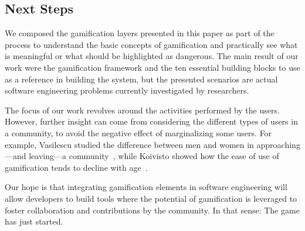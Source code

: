 \subsection{Next Steps}

We composed the gamification layers presented in this paper as part of the process to understand the basic concepts of gamification and practically see what is meaningful or what should be highlighted as dangerous.
The main result of our work were the gamification framework and the ten essential building blocks to use as a reference in building the system, but the presented scenarios are actual software engineering problems currently investigated by researchers.

The focus of our work revolves around the activities performed by the users.
However, further insight can come from considering the different types of users in a community, to avoid the negative effect of marginalizing some users.
For example, Vasilescu \etal studied the difference between men and women in approaching---and leaving---a community~\cite{vasi2012}, while Koivisto \etal showed how the ease of use of gamification tends to decline with age~\cite{koiv2014}.


Our hope is that integrating gamification elements in software engineering will allow developers to build tools where the potential of gamification is leveraged to foster collaboration and contributions by the community.
In that sense: The game has just started.
